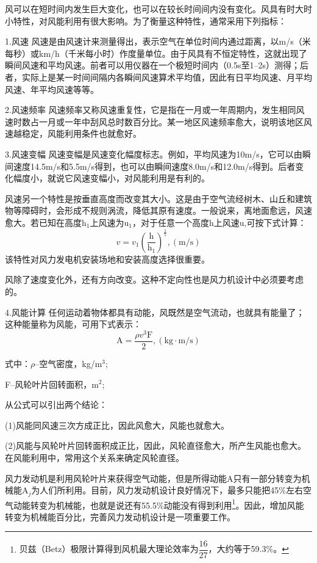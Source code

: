 \documentclass{ctexbook}
\begin{document}
风可以在短时间内发生巨大变化，也可以在较长时间间内没有变化。风具有时大时小特性，对风能利用有很大影响。为了衡量这种特性，通常采用下列指标：

1.风速 风速是由风速计来测量得出，表示空气在单位时间内通过距离，以m/s（米每秒）或km/h（千米每小时）作度量单位。由于风具有不恒定特性，这就出现了瞬间风速和平均风速。前者可以用仪器在一个极短时间内（0.5s至1--2s）测得；后者，实际上是某一时间间隔内各瞬间风速算术平均值，因此有日平均风速、月平均风速、年平均风速等等。

2.风速频率 风速频率又称风速重复性，它是指在一月或一年周期内，发生相同风速时数占一月或一年中刮风总时数百分比。某一地区风速频率愈大，说明该地区风速越稳定，风能利用条件也就愈好。

3.风速变幅 风速变幅是风速变化幅度标志。例如，平均风速为10m/s，它可以由瞬间速度14.5m/s和5.5m/s得到，也可以由瞬间速度8.0m/s和12.0m/s得到。后者变化幅度小，就说它风速变幅小，对风能利用是有利的。

风速另一个特性是按垂直高度而改变其大小。这是由于空气流经树木、山丘和建筑物等障碍时，会形成不规则涡流，降低其原有速度。一般说来，离地面愈远，风速愈大。若已知在高度h$_1$上风速为u$_1$，对于任意一个高度h上风速u,可按下式计算：
\begin{equation*}
	v=v_{1}(\frac{\text{h}}{\text{h}_{1}})^{\frac{1}{5}} , (\text{m/s})
\end{equation*}
该特性对风力发电机安装场地和安装高度选择很重要。

风除了速度变化外，还有方向改变。这种不定向性也是风力机设计中必须要考虑的。

4.风能计算 任何运动着物体都具有动能，风既然是空气流动，也就具有能量了；这种能量称为风能，可用下式表示：
\begin{equation*}
	\text{A}=\frac{\rho v^{3}\text{F}}{2} ,(\text{kg}\cdot \text{m/s})
\end{equation*}

式中：$\rho$--空气密度，kg/m$^{3}$;

F--风轮叶片回转面积，m$^{2}$;

从公式可以引出两个结论：

(1)风能同风速三次方成正比，因此风愈大，风能也就愈大。

(2)风能与风轮叶片回转面积成正比，因此，风轮直径愈大，所产生风能也愈大。在风能利用中，常用这个关系来确定风轮直径。

风力发动机是利用风轮叶片来获得空气动能，但是所得动能A只有一部分转变为机械能A$_j$为人们所利用。目前，风力发动机设计良好情况下，最多只能把45\%左右空气动能转变为机械能，也就是说还有55.5\%动能没有得到利用\footnote{贝兹（Betz）极限计算得到风机最大理论效率为$\dfrac{16}{27}$，大约等于59.3\%。}。因此，增加风能转变为机械能百分比，完善风力发动机设计是一项重要工作。
\end{document}
